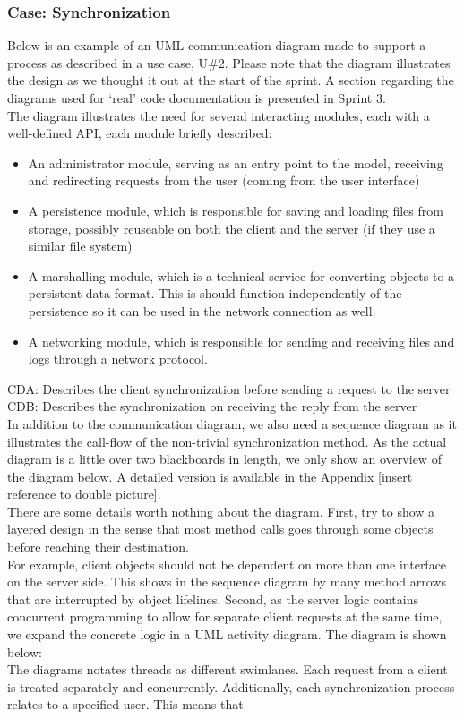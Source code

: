 \subsubsection{Case: Synchronization}
Below is an example of an UML communication diagram made to support a process as described in a use case, U\#2. Please note that the diagram illustrates the design as we thought it out at the start of the sprint. A section regarding the diagrams used for ‘real’ code documentation is presented in Sprint 3. \\
The diagram illustrates the need for several interacting modules, each with a well-defined API, each module briefly described:\\
\begin{itemize}
\item An administrator module, serving as an entry point to the model, receiving and redirecting requests from the user (coming from the user interface)
\item A persistence module, which is responsible for saving and loading files from storage, possibly reuseable on both the client and the server (if they use a similar file system)
\item A marshalling module, which is a technical service for converting objects to a persistent data format. This is should function independently of the persistence so it can be used in the network connection as well.
\item A networking module, which is responsible for sending and receiving files and logs through a network protocol.
\end{itemize}
CDA: Describes the client synchronization before sending a request to the server\\
CDB: Describes the synchronization on receiving the reply from the server\\
\newline
In addition to the communication diagram, we also need a sequence diagram as it illustrates the call-flow of the non-trivial synchronization method. As the actual diagram is a little over two blackboards in length, we only show an overview of the diagram below. A detailed version is available in the Appendix [insert reference to double picture].\\
There are some details worth nothing about the diagram. First, try to show a layered design in the sense that most method calls goes through some objects before reaching their destination.\\
For example, client objects should not be dependent on more than one interface on the server side. This shows in the sequence diagram by many method arrows that are interrupted by object lifelines. Second, as the server logic contains concurrent programming to allow for separate client requests at the same time, we expand the concrete logic in a UML activity diagram. The diagram is shown below:\\
\newline
The diagrams notates threads as different swimlanes. Each request from a client is treated separately and concurrently. Additionally, each synchronization process relates to a specified user. This means that 
\newpage